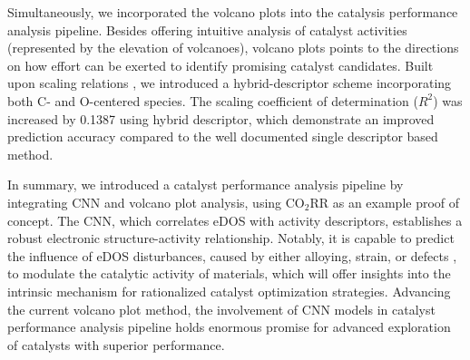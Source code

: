 Simultaneously, we incorporated the volcano plots into the catalysis performance analysis pipeline.
Besides offering intuitive analysis of catalyst activities (represented by the elevation of volcanoes), volcano plots points to the directions on how effort can be exerted to identify promising catalyst candidates.
Built upon scaling relations \cite{peterson2012activity}, we introduced a hybrid-descriptor scheme incorporating both C- and O-centered species.
The scaling coefficient of determination ($R^2$) was increased by 0.1387 using hybrid descriptor, which demonstrate an improved prediction accuracy compared to the well documented single descriptor based method.

In summary, we introduced a catalyst performance analysis pipeline by integrating CNN and volcano plot analysis, using CO$_2$RR as an example proof of concept.
The CNN, which correlates eDOS with activity descriptors, establishes a robust electronic structure-activity relationship.
Notably, it is capable to predict the influence of eDOS disturbances, caused by either alloying, strain, or defects \cite{norskov2011density, bera2017density, kusada2019emergence}, to modulate the catalytic activity of materials, which will offer insights into the intrinsic mechanism for rationalized catalyst optimization strategies.
Advancing the current volcano plot method, the involvement of CNN models in catalyst performance analysis pipeline holds enormous promise for advanced exploration of catalysts with superior performance.
